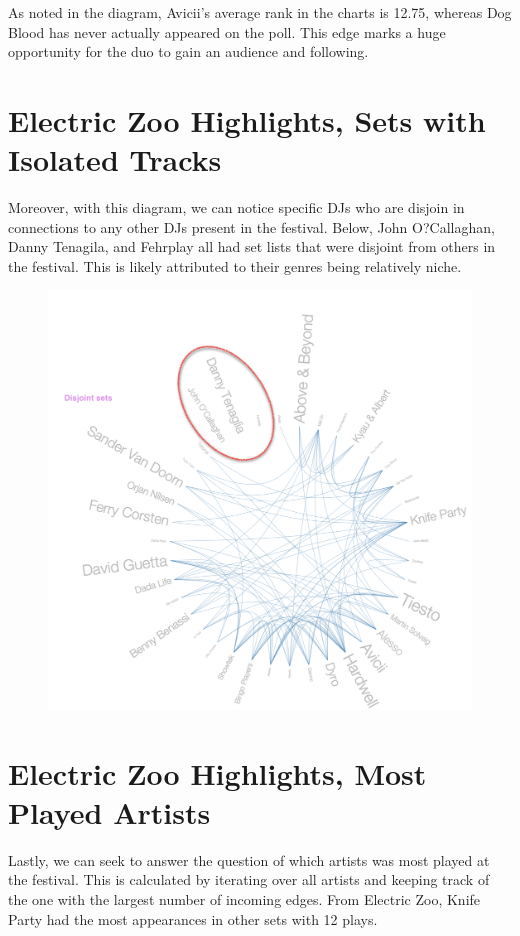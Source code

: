 \documentclass[12pt]{dalcsthesis}
\begin{document}
As noted in the diagram, Avicii's average rank in the charts is 12.75, whereas Dog Blood has never actually appeared on the poll. This edge marks a huge opportunity for the duo to gain an audience and following.

\section{Electric Zoo Highlights, Sets with Isolated Tracks}

Moreover, with this diagram, we can notice specific DJs who are disjoin in connections to any other DJs present in the festival. Below, John O?Callaghan, Danny Tenagila, and Fehrplay all had set lists that were disjoint from others in the festival. This is likely attributed to their genres being relatively niche. \newpage

\begin{figure}[h]
\includegraphics[scale=.5]{disjoint_sets}
\centering
\end{figure}

\section{Electric Zoo Highlights, Most Played Artists}

Lastly, we can seek to answer the question of which artists was most played at the festival. This is calculated by iterating over all artists and keeping track of the one with the largest number of incoming edges. From Electric Zoo, Knife Party had the most appearances in other sets with 12 plays.  \newpage
\end{document}
